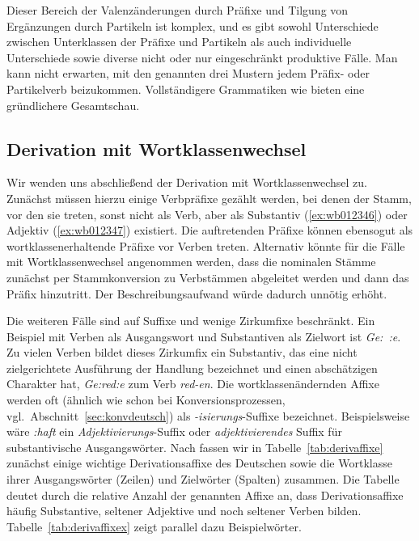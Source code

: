 Dieser Bereich der Valenzänderungen durch Präfixe und Tilgung von Ergänzungen durch Partikeln ist komplex, und es gibt sowohl Unterschiede zwischen Unterklassen der Präfixe und Partikeln als auch individuelle Unterschiede sowie diverse nicht oder nur eingeschränkt produktive Fälle.
Man kann nicht erwarten, mit den genannten drei Mustern jedem Präfix- oder Partikelverb beizukommen.
Vollständigere Grammatiken wie \citet{Eisenberg1} bieten eine gründlichere Gesamtschau.

\subsection{Derivation mit Wortklassenwechsel}

Wir wenden uns abschließend der Derivation mit Wortklassenwechsel zu.
Zunächst müssen hierzu einige Verbpräfixe gezählt werden, bei denen der Stamm, vor den sie treten, sonst nicht als Verb, aber als Substantiv (\ref{ex:wb012346}) oder Adjektiv (\ref{ex:wb012347}) existiert.
Die auftretenden Präfixe können \idR ebensogut als wortklassenerhaltende Präfixe vor Verben treten.
Alternativ könnte für die Fälle mit Wortklassenwechsel angenommen werden, dass die nominalen Stämme zunächst per Stammkonversion zu Verbstämmen abgeleitet werden und dann das Präfix hinzutritt.
Der Beschreibungsaufwand würde dadurch unnötig erhöht. 

\begin{exe}
  \ex\label{ex:wb012346}
  \begin{xlist}
  \end{xlist}
  \ex\label{ex:wb012347}
  \begin{xlist}
  \end{xlist}
\end{exe}

Die weiteren Fälle sind auf Suffixe und wenige Zirkumfixe beschränkt.
Ein Beispiel mit Verben als Ausgangswort und Substantiven als Zielwort ist \textit{Ge:~:e}.
Zu vielen Verben bildet dieses Zirkumfix ein Substantiv, das eine nicht zielgerichtete Ausführung der Handlung bezeichnet und einen abschätzigen Charakter hat, \zB \textit{Ge:red:e} zum Verb \textit{red-en}.
Die wortklassenändernden Affixe werden oft (ähnlich wie schon bei Konversionsprozessen, vgl.\ Abschnitt~\ref{sec:konvdeutsch}) als \textit{-isierungs}-Suffixe bezeichnet.
Beispielsweise wäre \textit{:haft} ein \textit{Adjektivierungs}-Suffix oder \textit{adjektivierendes} Suffix für substantivische Ausgangswörter.
Nach \citet[267]{Eisenberg1} fassen wir in Tabelle~\ref{tab:derivaffixe} zunächst einige wichtige Derivationsaffixe des Deutschen sowie die Wortklasse ihrer Ausgangswörter (Zeilen) und Zielwörter (Spalten) zusammen.
Die Tabelle deutet durch die relative Anzahl der genannten Affixe an, dass Derivationsaffixe häufig Substantive, seltener Adjektive und noch seltener Verben bilden.
Tabelle~\ref{tab:derivaffixex} zeigt parallel dazu Beispielwörter.

